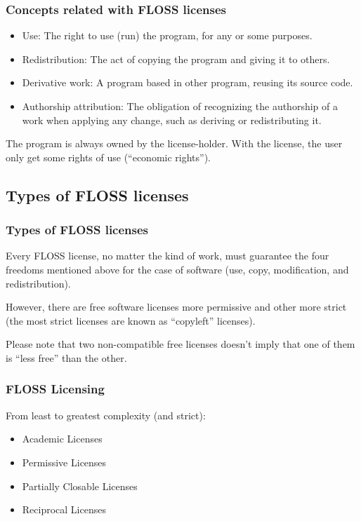 \begin{frame}
\frametitle{Concepts related with FLOSS licenses}

\begin{itemize}
\item \alert{Use}: The right to use (run) the program, for any or some
  purposes.
\item \alert{Redistribution}: The act of copying the program and giving it to
  others.
\item \alert{Derivative work}: A program based in other program, reusing its
  source code.
\item \alert{Authorship attribution}: The obligation of recognizing the
  authorship of a work when applying any change, such as deriving or
  redistributing it.
\end{itemize}

The program is always owned by the license-holder. With the license, the user only get some rights of use (``economic rights'').

\end{frame}


\subsection{Types of FLOSS licenses}
\begin{frame}
\frametitle{Types of FLOSS licenses}
Every \alert{FLOSS license}, no matter the kind of work, must guarantee the \alert{four freedoms} mentioned above for the case of software (use, copy, modification, and redistribution).\\\pause

\medskip

However, there are free software licenses more permissive and other more strict (the most strict licenses are known as ``copyleft'' licenses). \\\pause

\medskip

Please note that two non-compatible free licenses \alert{doesn't imply} that one of them is ``less free'' than the other. 

\end{frame}



\begin{frame}
\frametitle{FLOSS Licensing}

From least to greatest complexity (and strict):
\begin{itemize}
\item \alert{Academic Licenses}
\item \alert{Permissive Licenses}
\item \alert{Partially Closable Licenses}
\item \alert{Reciprocal Licenses}
\end{itemize}

\end{frame}

